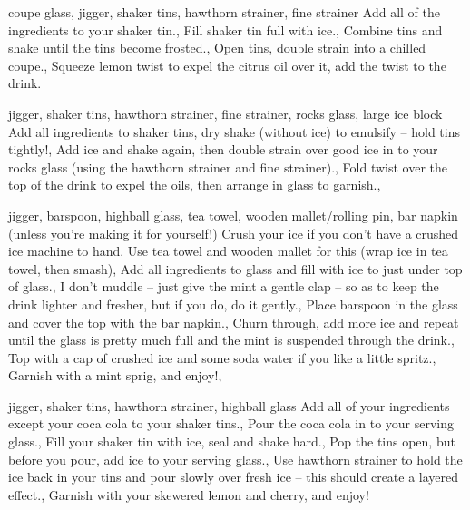 %
{coupe glass, jigger, shaker tins, hawthorn strainer, fine strainer}
%
{Add all of the ingredients to your shaker tin.,
    Fill shaker tin full with ice.,
    Combine tins and shake until the tins become frosted.,
    Open tins, double strain into a chilled coupe.,
Squeeze lemon twist to expel the citrus oil over it, add the twist to the drink.}

%
{jigger, shaker tins, hawthorn strainer, fine strainer, rocks glass, large ice block}
%
{
    Add all ingredients to shaker tins, dry shake (without ice) to emulsify – hold tins
    tightly!,
    Add ice and shake again, then double strain over good ice in to your rocks glass
    (using the hawthorn strainer and fine strainer).,
    Fold twist over the top of the drink to expel the oils, then arrange in glass to
    garnish.,
}




%
{jigger, barspoon, highball glass, tea towel, wooden mallet/rolling pin, bar
napkin (unless you’re making it for yourself!)}
%
{
    {Crush your ice if you don’t have a crushed ice machine to hand. Use tea towel and
    wooden mallet for this (wrap ice in tea towel, then smash)},
    Add all ingredients to glass and fill with ice to just under top of glass.,
    {    I don’t muddle – just give the mint a gentle clap – so as to keep the drink
    lighter and fresher, but if you do, do it gently.},
    Place barspoon in the glass and cover the top with the bar napkin.,
    Churn through, add more ice and repeat until the glass is pretty much full and the mint is suspended through the drink.,
    Top with a cap of crushed ice and some soda water if you like a little spritz.,
    {Garnish with a mint sprig, and enjoy!},
}



%
{jigger, shaker tins, hawthorn strainer, highball glass}
%
{
    Add all of your ingredients except your coca cola to your shaker tins.,
    Pour the coca cola in to your serving glass.,
    Fill your shaker tin with ice, seal and shake hard.,
    Pop the tins open, but before you pour, add ice to your serving glass.,
    Use hawthorn strainer to hold the ice back in your tins and pour slowly over fresh ice – this should create a layered effect.,
    Garnish with your skewered lemon and cherry, and enjoy!
}






%
%




